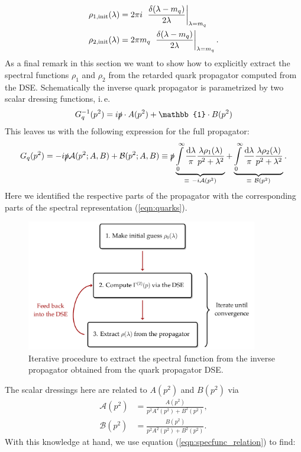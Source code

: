 \begin{equation}
	\begin{aligned}
		\rho_{1,\mathrm{init}}(\lambda) &= 2\pi i\ \eval{\frac{\delta(\lambda-m_q)}{2\lambda}}_{\lambda=m_q}\\
		\rho_{2,\mathrm{init}}(\lambda) &= 2\pi m_q\ \eval{\frac{\delta(\lambda-m_q)}{2\lambda}}_{\lambda=m_q}.
	\end{aligned}
\end{equation}
As a final remark in this section we want to show how to explicitly extract the spectral functions $\rho_1$ and $\rho_2$ from the retarded quark propagator computed from the DSE. Schematically the inverse quark propagator is parametrized by two scalar dressing functions, i.\,e.
 \begin{equation}
 	G_q^{-1}(p^2) = i\slashed{p}\cdot A(p^2) + \mathbb{1}\cdot B(p^2)
 \end{equation}
 This leaves us with the following expression for the full propagator:
\begin{equation}
	G_q(p^2) = -i\slashed{p} \mathcal{A}(p^2; A,B) + \mathcal{B}(p^2; A,B) \equiv \slashed{p}\underbrace{\int\limits_0^\infty\frac{\dd\lambda}{\pi}\frac{\lambda\rho_1(\lambda)}{p^2+\lambda^2}}_{\equiv\ -i\mathcal{A}(p^2)} + \underbrace{\int\limits_0^\infty\frac{\dd\lambda}{\pi}\frac{\lambda\rho_2(\lambda)}{p^2+\lambda^2}}_{\equiv\ \mathcal{B}(p^2)}.
\end{equation}
Here we identified the respective parts of the propagator with the corresponding parts of the spectral representation (\ref{eqn:quarks}). \newpage
\begin{figure}[h]
	\centering
	\includegraphics[width = 0.9\textwidth]{figures/iterative_computation}
	\caption{Iterative procedure to extract the spectral function from the inverse propagator obtained from the quark propagator DSE.} 
	\label{fig:code}
\end{figure}
\noindent The  scalar dressings here are related to $A(p^2)$ and $B(p^2)$ via
\begin{equation}
	\begin{aligned}
		\mathcal{A}(p^2) &= \frac{A(p^2)}{p^2A^2(p^2) + B^2(p^2)}, \\
		\mathcal{B}(p^2) &= \frac{B(p^2)}{p^2A^2(p^2) + B^2(p^2)}.
	\end{aligned}
\end{equation}
\noindent With this knowledge at hand, we use equation (\ref{eqn:specfunc_relation}) to find:

